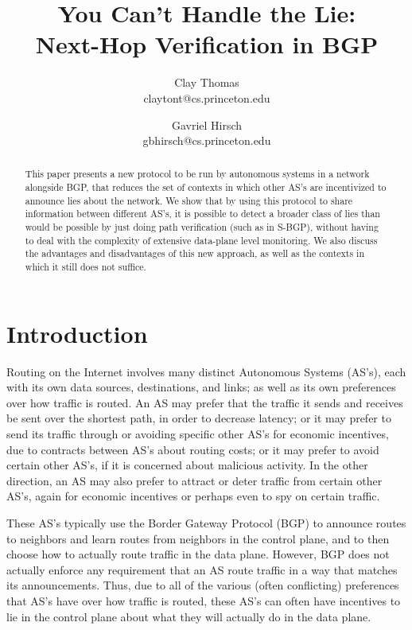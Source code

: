 \documentclass[12pt]{article}
\begin{document}

\title{
  You Can't Handle the Lie: \\
  Next-Hop Verification in BGP
}
\author{
  Clay Thomas\\ claytont@cs.princeton.edu
  \and 
  Gavriel Hirsch\\ gbhirsch@cs.princeton.edu 
}
\maketitle

\begin{abstract}
  This paper presents a new protocol to be run by autonomous systems in a network alongside BGP, that reduces the set of contexts in which other AS's are incentivized to announce lies about the network. We show that by using this protocol to share information between different AS's, it is possible to detect a broader class of lies than would be possible by just doing path verification (such as in S-BGP), without having to deal with the complexity of extensive data-plane level monitoring. We also discuss the advantages and disadvantages of this new approach, as well as the contexts in which it still does not suffice.
\end{abstract}


\section{Introduction}
Routing on the Internet involves many distinct Autonomous Systems (AS's), each with its own data sources, destinations, and links; as well as its own preferences over how traffic is routed. An AS may prefer that the traffic it sends and receives be sent over the shortest path, in order to decrease latency; or it may prefer to send its traffic through or avoiding specific other AS's for economic incentives, due to contracts between AS's about routing costs; or it may prefer to avoid certain other AS's, if it is concerned about malicious activity. In the other direction, an AS may also prefer to attract or deter traffic from certain other AS's, again for economic incentives or perhaps even to spy on certain traffic.

These AS's typically use the Border Gateway Protocol (BGP) to announce routes to neighbors and learn routes from neighbors in the control plane, and to then choose how to actually route traffic in the data plane. However, BGP does not actually enforce any requirement that an AS route traffic in a way that matches its announcements. Thus, due to all of the various (often conflicting) preferences that AS's have over how traffic is routed, these AS's can often have incentives to lie in the control plane about what they will actually do in the data plane.
\end{document}
